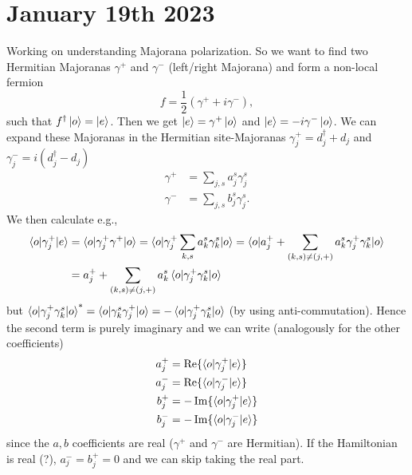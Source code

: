 \documentclass{article}
\begin{document}
\section{January 19th 2023}
Working on understanding Majorana polarization. So we want to find two Hermitian Majoranas $\gamma^+$ and $\gamma^-$ (left/right Majorana) and form a non-local fermion
\begin{equation}
   f = \frac{1}{2}(\gamma^+ + i\gamma^-), 
\end{equation}
such that $f^\dag\ket{o} = \ket{e}$. Then we get $\ket{e} = \gamma^+\ket{o}$ and $\ket{e} = -i\gamma^-\ket{o}$. We can expand these Majoranas in the Hermitian site-Majoranas $\gamma_j^+ = d^\dag_j + d_j$ and $\gamma^-_j = i(d^\dag_j - d_j)$
\begin{equation}
\begin{split}
    \gamma^+ &= \sum_{j,s} a_j^s \gamma_j^s \\
    \gamma^- &= \sum_{j,s} b_j^s \gamma_j^s. 
\end{split}
\end{equation}
We then calculate e.g.,
\begin{equation}
    \begin{split}
        \braket{o|\gamma_j^+|e} &= \braket{o|\gamma_j^+ \gamma^+|o} = \braket{o|\gamma_j^+ \sum_{k,s} a_k^s \gamma_k^s|o} = \braket{o|a_j^+ + \sum_{(k, s)\neq(j,+)}a_k^s\gamma_j^+\gamma_k^s|o} \\
                                &= a_j^+ + \sum_{(k, s)\neq(j,+)} a_k^s \braket{o|\gamma_j^+\gamma_k^s|o}
    \end{split}
\end{equation}
but $\braket{o|\gamma_j^+\gamma_k^s|o}^*=\braket{o|\gamma_k^s\gamma_j^+|o} = -\braket{o|\gamma_j^+\gamma_k^s|o}$ (by using anti-commutation). Hence the second term is purely imaginary and we can write (analogously for the other coefficients)
\begin{equation}
    \begin{split}
        a_j^+ &= \operatorname{Re}\{\braket{o|\gamma_j^+|e}\} \\
        a_j^- &= \operatorname{Re}\{\braket{o|\gamma_j^-|e}\} \\
        b_j^+ &= -\operatorname{Im}\{\braket{o|\gamma_j^+|e}\} \\
        b_j^- &= -\operatorname{Im}\{\braket{o|\gamma_j^-|e}\} \\
    \end{split}
\end{equation}
since the $a,b$ coefficients are real ($\gamma^+$ and $\gamma^-$ are Hermitian). If the Hamiltonian is real (?), $a_j^- = b_j^+ = 0$ and we can skip taking the real part.
\end{document}
